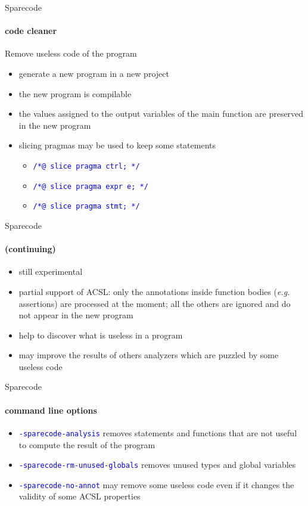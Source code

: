 \documentclass{beamer}
\newcommand{\orange}[1]{{\textcolor{frama-c-1}{#1}}}
\newcommand{\vvert}[1]{{\textcolor{vert}{#1}}}
\newcommand{\bleu}[1]{{\textcolor{blue}{#1}}}
\newcommand{\code}[1]{\bleu{\texttt{#1}}}
\newcommand{\continuing}{\framesubtitle{(continuing)}}
\newcommand{\intro}[1]{\begin{center}\vvert{#1}\end{center}}
\newenvironment{sect}[1]{\orange{#1}\begin{itemize}}{\end{itemize}}
\newenvironment{features}{\begin{sect}{Features}}{\end{sect}}
\newenvironment{warnings}{\begin{sect}{Warnings}}{\end{sect}}
\newenvironment{whatitisgoodfor}{\begin{sect}{What is it good for}}{\end{sect}}
\newenvironment{howtouse}{\begin{sect}{How to use}}{\end{sect}}
\begin{document}
\begin{frame}{Sparecode}
\framesubtitle{code cleaner}

\intro{Remove useless code of the program}

\begin{features}
\item generate a new program in a new project
\item the new program is compilable
\item the values assigned to the output variables of the main function are
  preserved in the new program
\item slicing pragmas may be used to keep some statements
  \begin{itemize}
  \item \code{/*@ slice pragma ctrl; */}
  \item \code{/*@ slice pragma expr e; */}
  \item \code{/*@ slice pragma stmt; */}
  \end{itemize}
\end{features}

\end{frame}


\begin{frame}{Sparecode}
\continuing

\begin{warnings}
\item still experimental
\item partial support of ACSL: only the annotations inside function bodies
  (\emph{e.g.} assertions) are processed at the moment; all the others are
  ignored and do not appear in the new program
\end{warnings}\medskip

\begin{whatitisgoodfor}
\item help to discover what is useless in a program
\item may improve the results of others analyzers which are puzzled by some
  useless code
\end{whatitisgoodfor}

\end{frame}


\begin{frame}{Sparecode}
\framesubtitle{command line options}

\begin{howtouse}
\item \code{-sparecode-analysis} removes statements and functions that are not
  useful to compute the result of the program
\item \code{-sparecode-rm-unused-globals} removes unused types and global variables
\item \code{-sparecode-no-annot} may remove some useless code even if it
  changes the validity of some ACSL properties
\end{howtouse}

\end{frame}
\end{document}
